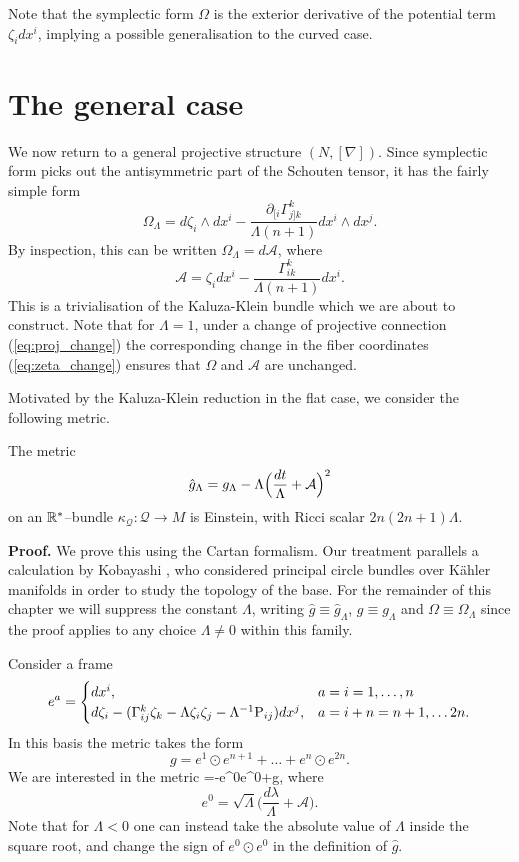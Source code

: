 Note that the symplectic form $\Omega$ is the exterior derivative
of the potential term $\zeta_{i} dx^{i}$, implying a possible
generalisation to the curved case.


\section{The general case}

We now return to a general projective structure $(N,[\nabla])$. Since
symplectic form picks out the antisymmetric part of the Schouten tensor,
it has the fairly simple form
\[
\Omega_{\Lambda}= d\zeta_{i}\wedge dx^{i}-\frac{\partial_{[i}\Gamma_{j]k}^{k}}{\Lambda(n+1)} dx^{i}\wedge dx^{j}.
\]
By inspection, this can be written $\Omega_{\Lambda}=d\mathcal{A}$,
where
\[
\mathcal{A}=\zeta_{i} dx^{i}-\frac{\Gamma_{ik}^{k}}{\Lambda(n+1)} dx^{i}.
\]
This is a trivialisation of the Kaluza-Klein bundle which we are about
to construct. Note that for $\Lambda=1$, under a change of projective
connection (\ref{eq:proj_change}) the corresponding change in the
fiber coordinates (\ref{eq:zeta_change}) ensures that $\Omega$ and
$\mathcal{A}$ are unchanged.

Motivated by the Kaluza-Klein reduction in the flat case, we consider
the following metric.
\begin{theo}
The metric
\begin{equation}
\hat{g}_{\Lambda}=g_{\Lambda}-\Lambda\Bigl(\frac{ dt}{\Lambda}+\mathcal{A}\Bigr)^{2}\label{eq:G}
\end{equation}
on an $\mathbb{R}^*$--bundle $\kappa_\mathcal{Q}:\mathcal{Q}\rightarrow M$ is Einstein,
with Ricci scalar $2n(2n+1)\Lambda$.
\end{theo}
\textbf{Proof.} We prove this using the Cartan formalism. Our treatment
parallels a calculation by Kobayashi \cite{Kob}, who considered
principal circle bundles over K\"ahler manifolds in order to study the
topology of the base. For the remainder of this chapter we will suppress the constant $\Lambda$, writing $\hat{g}\equiv\hat{g}_{\Lambda}$, $g\equiv g_{\Lambda}$ and $\Omega\equiv\Omega_\Lambda$ since the proof applies to any choice $\Lambda\neq0$ within this family.

Consider a frame
\begin{equation}
e^{a}=\begin{cases}
 dx^{i}, & a=i=1,\dots,n\\
 d\zeta_{i}-(\Gamma_{ij}^{k}\zeta_{k}-\Lambda \zeta_{i}\zeta_{j}-\Lambda^{-1}\mathrm{P}_{ij}) dx^{j}, & a=i+n=n+1,\dots2n.
\end{cases}\label{eq:basis}
\end{equation}
In this basis the metric takes the form
\begin{equation}
g=e^{1}\odot e^{n+1}+\dots+e^{n}\odot e^{2n}.\label{eq:g_cov_const}
\end{equation}
We are interested in the metric
\be \label{eq:lifted_metric}
=-e^{0}\odot e^{0}+g,
\ee
where
\[
e^{0}=\sqrt{\Lambda}\biggl(\frac{ d\lambda}{\Lambda}+\mathcal{A}\biggr).
\]
Note that for $\Lambda<0$ one can instead take the absolute value of $\Lambda$ inside the square root, and change the sign of $e^{0}\odot e^{0}$ in the definition of $\hat{g}$.

